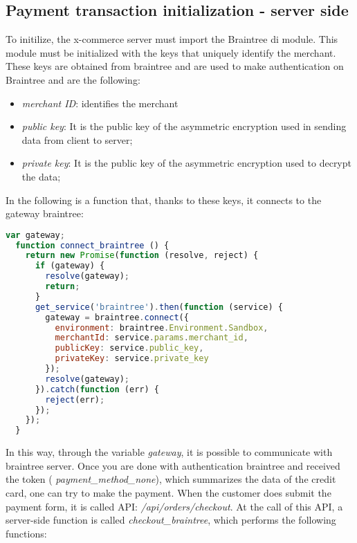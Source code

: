 \subsection{Payment transaction initialization - server side}
To initilize, the x-commerce server must import the Braintree di module.
This module must be initialized with the keys that uniquely identify the merchant.
\newline
These keys are obtained from braintree and are used to make authentication on Braintree and are the following:
\begin{itemize}
\item \emph{merchant ID}: identifies the merchant
\item \emph{public key}: It is the public key of the asymmetric encryption used in sending data from client to server;
\item \emph{private key}: It is the public key of the asymmetric encryption used to decrypt the data;
\end{itemize}
In the following is a function that, thanks to these keys, it connects to the gateway braintree:
\begin{lstlisting}[language=javascript]
  var gateway;
  function connect_braintree () {
    return new Promise(function (resolve, reject) {
      if (gateway) {
        resolve(gateway);
        return;
      }
      get_service('braintree').then(function (service) {
        gateway = braintree.connect({
          environment: braintree.Environment.Sandbox,
          merchantId: service.params.merchant_id,
          publicKey: service.public_key,
          privateKey: service.private_key
        });
        resolve(gateway);
      }).catch(function (err) {
        reject(err);
      });
    });
  }
\end{lstlisting}
In this way, through the variable \emph{gateway}, it is possible to communicate with braintree server.
\newline
Once you are done with authentication braintree and received the token ( \emph{payment\_method\_none}), which summarizes the data of the credit card, one can try to make the payment.
\newline
When the customer does submit the payment form, it is called API: \emph{/api/orders/checkout}.
At the call of this API, a server-side function is called \emph{checkout\_braintree}, which performs the following functions:
